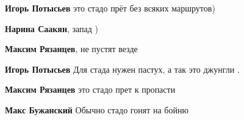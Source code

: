 \begin{itemize}
\begin{itemize}
 
\textbf{Игорь Потысьев} это стадо прёт без всяких маршрутов)

 
\textbf{Нарина Саакян}, запад )

 
\textbf{Максим Рязанцев}, не пустят везде

 
\textbf{Игорь Потысьев} Для стада нужен пастух, а так это джунгли .

 
\textbf{Максим Рязанцев} это стадо прет к пропасти

 
\textbf{Макс Бужанский} Обычно стадо гонят на бойню

\end{itemize}

 


\end{itemize}
